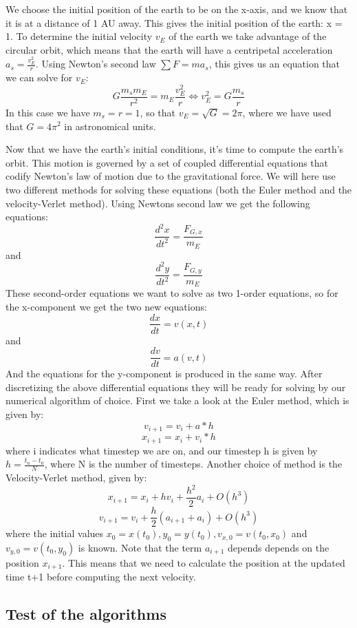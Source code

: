 \documentclass[twocolumn]{article}
\begin{document}
We choose the initial position of the earth to be on the x-axis, and we know that it is at a distance of 1 AU away. This gives the initial position of the earth: x = 1.\newline
To determine the initial velocity $v_E$ of the earth we take advantage of the circular orbit, which means that the earth will have a centripetal acceleration $a_s = \frac{v_E^2}{r}$. Using Newton's second law $\sum{F} = ma_s$, this gives us an equation that we can solve for $v_E$:
$$ G\frac{m_s m_E}{r^2} = m_E\frac{v_E^2}{r} \Leftrightarrow v_E^2 = G\frac{m_s}{r}$$
In this case we have $m_s = r = 1$, so that $v_E = \sqrt{G} = 2\pi$, where we have used that $G = 4\pi^2$ in astronomical units.\newline

Now that we have the earth's initial conditions, it's time to compute the earth's orbit. This motion is governed by a set of coupled differential equations that codify Newton's law of motion due to the gravitational force. We will here use two different methods for solving these equations (both the Euler method and the velocity-Verlet method).
Using Newtons second law we get the following equations:
$$ \frac{d^2x}{dt^2} = \frac{F_{G,x}}{m_E} $$ and $$ \frac{d^2y}{dt^2} = \frac{F_{G,y}}{m_E} $$
These second-order equations we want to solve as two 1-order equations, so for the x-component we get the two new equations:
$$ \frac{dx}{dt} = v(x, t)$$ and $$ \frac{dv}{dt} = a(v, t) $$
And the equations for the y-component is produced in the same way.\newline
After discretizing the above differential equations they will be ready for solving by our numerical algorithm of choice. First we take a look at the Euler method, which is given by:
$$ v_{i+1} = v_i + a*h$$
$$ x_{i+1} = x_i + v_i*h $$
where i indicates what timestep we are on, and our timestep h is given by $h = \frac{t_n - t_0}{N}$, where N is the number of timesteps.\newline
Another choice of method is the Velocity-Verlet method, given by:
$$ x_{i+1} = x_i + hv_i + \frac{h^2}{2}a_i + O(h^3) $$
$$ v_{i+1} = v_i + \frac{h}{2}( a_{i+1} + a_i ) + O(h^3) $$
where the initial values $x_0 = x(t_0), y_0 = y(t_0), v_{x,0} = v(t_0,x_0)$ and $v_{y,0} = v(t_0,y_0)$ is known.
Note that the term $a_{i+1}$ depends depends on the position $x_{i+1}$. This means that we need to calculate the position at the updated time t+1 before computing the next velocity.

\subsection*{Test of the algorithms}
\end{document}
